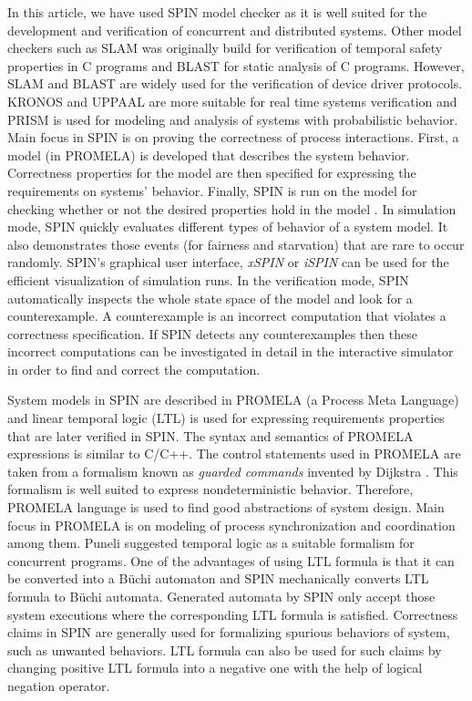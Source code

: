 \documentclass[conference]{IEEEtran}
\begin{document}
In this article, we have used SPIN \cite{7} model checker as it is well suited for the development and verification of concurrent and distributed 
systems. Other model checkers such as SLAM \cite{10} was originally build for verification of temporal safety properties in C programs
and BLAST \cite{4} for static analysis of C programs. However, SLAM and BLAST are widely used for the verification of device driver protocols.
KRONOS \cite{11} and UPPAAL \cite{12} are more suitable for real time systems verification and PRISM \cite{15} is used for modeling and analysis of 
systems with probabilistic behavior. Main focus in SPIN is on proving the correctness of process interactions. First, a model (in PROMELA) 
is developed that describes the system behavior. Correctness properties for the model are then specified for expressing the requirements on systems’ 
behavior. Finally, SPIN is run on the model for checking whether or not the desired properties hold in the model \cite{17}. In simulation mode, 
SPIN quickly evaluates different types of behavior of a system model. It also demonstrates those events (for fairness and starvation) that are 
rare to occur randomly. SPIN's graphical user interface, \textit{xSPIN} or \textit{iSPIN} can be used for the efficient visualization of 
simulation runs. In the verification mode, SPIN automatically inspects the whole state space of the model and look for a counterexample. 
A counterexample is an incorrect computation that violates a correctness specification. If SPIN detects any counterexamples then these incorrect 
computations can be investigated in detail in the interactive simulator in order to find and correct the computation. 

System models in SPIN are described in PROMELA (a Process Meta Language) \cite{17} and linear temporal logic (LTL) is used for expressing 
requirements properties that are later verified in SPIN. The syntax and semantics of PROMELA expressions is similar to C/C++. The control statements
used in PROMELA are taken from a formalism known as \textit{guarded commands} invented by Dijkstra \cite{23}. This formalism is well suited to 
express nondeterministic behavior. Therefore, PROMELA language is used to find good abstractions of system design. Main focus in PROMELA is on 
modeling of process synchronization and coordination among them. Puneli \cite{16} suggested temporal logic as a suitable formalism for concurrent 
programs. One of the advantages of using LTL formula is that it can be converted into a B\"{u}chi automaton \cite{24} and SPIN mechanically converts
LTL formula to B\"{u}chi automata. Generated automata by SPIN only accept those system executions where the corresponding LTL formula is 
satisfied. Correctness claims in SPIN are generally used for formalizing spurious behaviors of system, such as unwanted behaviors. 
LTL formula can also be used for such claims by changing positive LTL formula into a negative one with the help of logical negation operator.
\end{document}
